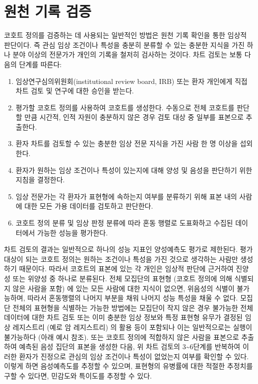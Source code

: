 \documentclass[11pt]{book}
\providecommand{\tightlist}{%
  \setlength{\itemsep}{0pt}\setlength{\parskip}{0pt}}
\theoremstyle{definition}
\theoremstyle{definition}
\theoremstyle{definition}
\theoremstyle{remark}
\begin{document}
\section{원천 기록 검증}\label{--}


코호트 정의를 검증하는 데 사용되는 일반적인 방법은 원천 기록 확인을 통한
임상적 판단이다. 즉 관심 임상 조건이나 특성을 충분히 분류할 수 있는
충분한 지식을 가진 하나 분야 이상의 전문가가 개인의 기록을 철저히
검사하는 것이다. 차트 검토는 보통 다음의 단계를 따른다:

\begin{enumerate}
\def\labelenumi{\arabic{enumi}.}
\tightlist
\item
  임상연구심의위원회(institutional review board, IRB) 또는 환자 개인에게
  직접 차트 검토 및 연구에 대한 승인을 받는다.
\item
  평가할 코호트 정의를 사용하여 코호트를 생성한다. 수동으로 전체
  코호트를 판단할 만큼 시간적, 인적 자원이 충분하지 않은 경우 검토 대상
  중 일부를 표본으로 추출한다.
\item
  환자 차트를 검토할 수 있는 충분한 임상 전문 지식을 가진 사람 한 명
  이상을 섭외한다.
\item
  환자가 원하는 임상 조건이나 특성이 있는지에 대해 양성 및 음성을
  판단하기 위한 지침을 결정한다.
\item
  임상 전문가는 각 환자가 표현형에 속하는지 여부를 분류하기 위해 표본
  내의 사람에 대한 모든 가용 데이터를 검토하고 판단한다.
\item
  코호트 정의 분류 및 임상 판정 분류에 따라 혼동 행렬로 도표화하고
  수집된 데이터에서 가능한 성능을 평가한다.
\end{enumerate}

차트 검토의 결과는 일반적으로 하나의 성능 지표인 양성예측도 평가로
제한된다. 평가 대상이 되는 코호트 정의는 원하는 조건이나 특성을 가진
것으로 생각하는 사람만 생성하기 때문이다. 따라서 코호트의 표본에 있는 각
개인은 임상적 판단에 근거하여 진양성 또는 위양성 중 하나로 분류된다.
전체 모집단의 표현형 (코호트 정의에 의해 식별되지 않은 사람을 포함) 에
있는 모든 사람에 대한 지식이 없으면, 위음성의 식별이 불가능하며, 따라서
혼동행렬의 나머지 부분을 채워 나머지 성능 특성을 채울 수 없다. 모집단
전체의 표현형을 식별하는 가능한 방법에는 모집단이 작지 않은 경우
불가능한 전체 데이터에 대한 차트 검토 또는 이미 충분한 임상 정보와 특정
표현형 유무가 결정된 임상 레지스트리 (예로 암 레지스트리) 의 활용 등이
포함되나 이는 일반적으로는 실행이 불가능하다 (아래 예시 참조). 또는
코호트 정의에 적합하지 않은 사람을 표본으로 추출하여 예측된 음성 집단의
표본을 생성한 다음, 위 차트 검토의 3\textasciitilde{}6단계를 반복하여
이러한 환자가 진정으로 관심의 임상 조건이나 특성이 없었는지 여부를
확인할 수 있다. 이렇게 하면 음성예측도를 추정할 수 있으며, 표현형의
유병률에 대한 적절한 추정치를 구할 수 있다면, 민감도와 특이도를 추정할
수 있다.
\end{document}
